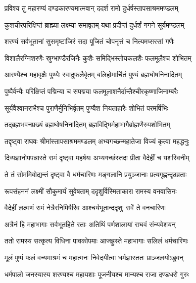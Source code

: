 

\twolineshloka
{प्रविश्य तु महारण्यं दण्डकारण्यमात्मवान्}
{ददर्श रामो दुर्धर्षस्तापसाश्रममण्डलम्} %

\twolineshloka
{कुशचीरपरिक्षिप्तं ब्राह्म्या लक्ष्म्या समावृतम्}
{यथा प्रदीप्तं दुर्धर्शं गगने सूर्यमण्डलम्} %

\twolineshloka
{शरण्यं सर्वभूतानां सुसमृष्टाजिरं सदा}
{पूजितं चोपनृत्तं च नित्यमप्सरसां गणैः} %

\twolineshloka
{विशालैरग्निशरणैः स्रुग्भाण्डैरजिनैः कुशैः}
{समिद्भिस्तोयकलशैः फलमूलैश्च शोभितम्} %

\twolineshloka
{आरण्यैश्च महावृक्षैः पुण्यैः स्वादुफलैर्वृतम्}
{बलिहोमार्चितं पुण्यं ब्रह्मघोषनिनादितम्} %

\twolineshloka
{पुष्पैर्वन्यैः परिक्षिप्तं पद्मिन्या च सपद्मया}
{फलमूलाशनैर्दान्तैश्चीरकृष्णाजिनाम्बरैः} %

\twolineshloka
{सूर्यवैश्वानराभैश्च पुराणैर्मुनिभिर्वृतम्}
{पुण्यैश नियताहारैः शोभितं परमर्षिभिः} %

\twolineshloka
{तद्ब्रह्मभवनप्रख्यं ब्रह्मघोषनिनादितम्}
{ब्रह्मविद्भिर्महाभागैर्ब्राह्मणैरुपशोभितम्} %

\twolineshloka
{तद्दृष्ट्वा राघवः श्रीमांस्तापसाश्रममण्डलम्}
{अभ्यगच्छन्महातेजा विज्यं कृत्वा महद्धनुः} %

\twolineshloka
{दिव्यज्ञानोपपन्नास्ते रामं दृष्ट्वा महर्षयः}
{अभ्यगच्छंस्तदा प्रीता वैदेहीं च यशस्विनीम्} %

\twolineshloka
{ते तं सोममिवोद्यन्तं दृष्ट्वा वै धर्मचारिणः}
{मङ्गलानि प्रयुञ्जानाः प्रत्यगृह्णन्दृढव्रताः} %

\twolineshloka
{रूपसंहननं लक्ष्मीं सौकुमार्यं सुवेषताम्}
{ददृशुर्विस्मिताकारा रामस्य वनवासिनः} %

\twolineshloka
{वैदेहीं लक्ष्मणं रामं नेत्रैरनिमिषैरिव}
{आश्चर्यभूतान्ददृशुः सर्वे ते वनचारिणः} %

\twolineshloka
{अत्रैनं हि महाभागाः सर्वभूतहिते रताः}
{अतिथिं पर्णशालायां राघवं संन्यवेशयन्} %

\twolineshloka
{ततो रामस्य सत्कृत्य विधिना पावकोपमाः}
{आजह्रुस्ते महाभागाः सलिलं धर्मचारिणः} %

\twolineshloka
{मूलं पुष्पं फलं वन्यमाश्रमं च महात्मनः}
{निवेदयीत्वा धर्मज्ञास्ततः प्राञ्जलयोऽब्रुवन्} %

\twolineshloka
{धर्मपालो जनस्यास्य शरण्यश्च महायशाः}
{पूजनीयश्च मान्यश्च राजा दण्डधरो गुरुः} %

